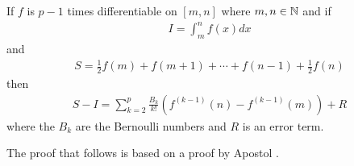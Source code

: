 \begin{lemma}
    \label{lem:euler_maclaurin}
    If $ f $ is $ p-1 $ times differentiable on $ [m, n] $ where $ m, n \in \mathbb{N} $ and
    if
    \begin{align}
        I = \int_m^n f(x)dx
    \end{align}
    and
    \begin{align}
        S = \frac{1}{2} f(m) + f(m+1) + \cdots + f(n-1) + \frac{1}{2} f(n)
    \end{align}
    then
    \begin{align}
        S - I = \sum_{k=2}^{p} \frac{B_k}{k!} \left( f^{(k-1)}(n) - f^{(k-1)}(m) \right) + R
    \end{align}
    where the $ B_k $ are the Bernoulli numbers and $ R $ is an error term. 
\end{lemma}
The proof that follows is based on a proof by Apostol \cite{Apostol1999}.
